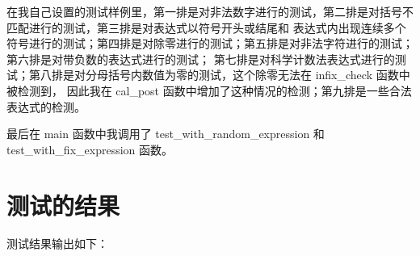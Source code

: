 \documentclass[UTF8]{ctexart}
\begin{document}
在我自己设置的测试样例里，第一排是对非法数字进行的测试，第二排是对括号不匹配进行的测试，第三排是对表达式以符号开头或结尾和
表达式内出现连续多个符号进行的测试；第四排是对除零进行的测试；第五排是对非法字符进行的测试；第六排是对带负数的表达式进行的测试；
第七排是对科学计数法表达式进行的测试；第八排是对分母括号内数值为零的测试，这个除零无法在 infix\_check 函数中被检测到，
因此我在 cal\_post 函数中增加了这种情况的检测；第九排是一些合法表达式的检测。

最后在 main 函数中我调用了 test\_with\_random\_expression 和 test\_with\_fix\_expression 函数。

\section{测试的结果}

测试结果输出如下：
\end{document}
